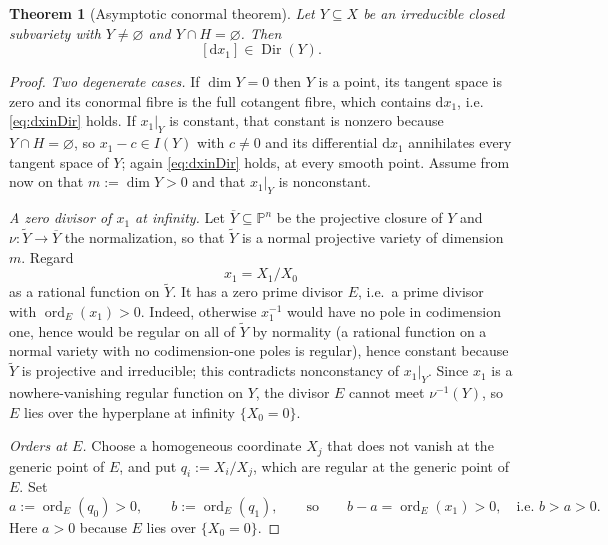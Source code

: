\documentclass[11pt]{article}
\theoremstyle{plain}
\newtheorem{theorem}{Theorem}[section]
\theoremstyle{definition}
\theoremstyle{remark}
\theoremstyle{plain}
\newcommand{\ord}{\operatorname{ord}}
\newcommand{\Dir}{\operatorname{Dir}}
\newcommand{\bbP}{\mathbb{P}}
\newcommand{\dd}{\mathrm{d}}
\begin{document}
\begin{theorem}[Asymptotic conormal theorem]\label{thm:asym}
Let $Y\subseteq X$ be an irreducible closed subvariety with $Y\neq\varnothing$
and $Y\cap H=\varnothing$. Then
\begin{equation}\label{eq:dxinDir}
  [\dd x_1]\in\Dir(Y).
\end{equation}
\end{theorem}

\begin{proof}
\emph{Two degenerate cases.} If $\dim Y=0$ then $Y$ is a point, its tangent
space is zero and its conormal fibre is the full cotangent fibre, which
contains $\dd x_1$, i.e. \eqref{eq:dxinDir} holds. If $x_1|_Y$ is constant, that constant is nonzero because
$Y\cap H=\varnothing$, so $x_1-c\in I(Y)$ with $c\neq0$ and its differential
$\dd x_1$ annihilates every tangent space of $Y$; again \eqref{eq:dxinDir}
holds, at every smooth point. Assume from now on that $m:=\dim Y>0$ and that
$x_1|_Y$ is nonconstant.

\emph{A zero divisor of $x_1$ at infinity.} Let $\overline Y\subseteq\bbP^n$ be
the projective closure of $Y$ and $\nu\colon\widetilde Y\to\overline Y$ the
normalization, so that $\widetilde Y$ is a normal projective variety of
dimension $m$. Regard
\[
  x_1=X_1/X_0
\]
as a rational function on $\widetilde Y$. It has a zero prime divisor $E$,
i.e.\ a prime divisor with $\ord_E(x_1)>0$. Indeed, otherwise $x_1^{-1}$ would
have no pole in codimension one, hence would be regular on all of
$\widetilde Y$ by normality (a rational function on a normal variety with no
codimension-one poles is regular), hence constant because $\widetilde Y$ is
projective and irreducible; this contradicts nonconstancy of $x_1|_Y$. Since
$x_1$ is a nowhere-vanishing regular function on $Y$, the divisor $E$ cannot
meet $\nu^{-1}(Y)$, so $E$ lies over the hyperplane at infinity $\{X_0=0\}$.

\emph{Orders at $E$.} Choose a homogeneous coordinate $X_j$ that does not
vanish at the generic point of $E$, and put $q_i:=X_i/X_j$, which are regular
at the generic point of $E$. Set
\begin{equation}\label{eq:ab}
  a:=\ord_E(q_0)>0,\qquad b:=\ord_E(q_1),
  \qquad\text{so}\qquad b-a=\ord_E(x_1)>0,\quad\text{i.e. } b>a>0 .
\end{equation}
Here $a>0$ because $E$ lies over $\{X_0=0\}$.


\end{proof}
\end{document}
